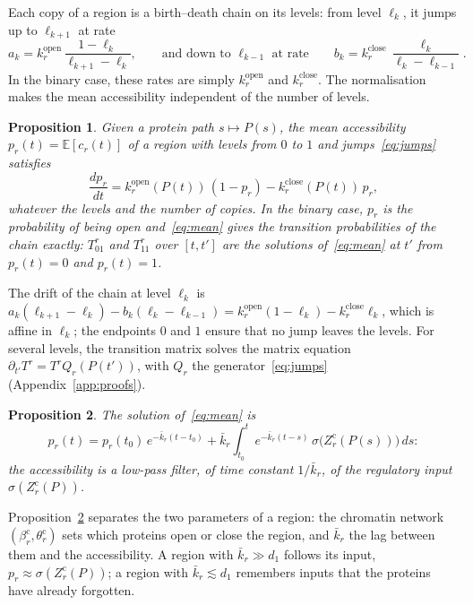 \documentclass[a4paper, 11pt]{article}
\newcommand{\E}{\mathbb{E}}
\newcommand{\kop}{k^{\mathrm{open}}}
\newcommand{\kcl}{k^{\mathrm{close}}}
\newcommand{\thc}{\theta^{\mathrm{c}}}
\newcommand{\bc}{\beta^{\mathrm{c}}}
\theoremstyle{plain}
\newtheorem{prop}{Proposition}
\theoremstyle{remark}
\begin{document}
Each copy of a region is a birth--death chain on its levels: from level $\ell_k$, it jumps up to $\ell_{k+1}$ at rate
\begin{equation}\label{eq:jumps}
a_k = \kop_r\,\frac{1 - \ell_k}{\ell_{k+1} - \ell_k}, \qquad\text{and down to } \ell_{k-1} \text{ at rate}\qquad b_k = \kcl_r\,\frac{\ell_k}{\ell_k - \ell_{k-1}} .
\end{equation}
In the binary case, these rates are simply $\kop_r$ and $\kcl_r$. The normalisation makes the mean accessibility independent of the number of levels.

\begin{prop}\label{prop:mean}
Given a protein path $s \mapsto P(s)$, the mean accessibility $p_r(t) = \E[c_r(t)]$ of a region with levels from $0$ to $1$ and jumps~\eqref{eq:jumps} satisfies
\begin{equation}\label{eq:mean}
\frac{dp_r}{dt} = \kop_r(P(t))\,(1 - p_r) - \kcl_r(P(t))\,p_r ,
\end{equation}
whatever the levels and the number of copies. In the binary case, $p_r$ is the probability of being open and~\eqref{eq:mean} gives the transition probabilities of the chain exactly: $T^r_{01}$ and $T^r_{11}$ over $[t, t']$ are the solutions of~\eqref{eq:mean} at $t'$ from $p_r(t) = 0$ and $p_r(t) = 1$.
\end{prop}

The drift of the chain at level $\ell_k$ is $a_k(\ell_{k+1} - \ell_k) - b_k(\ell_k - \ell_{k-1}) = \kop_r(1-\ell_k) - \kcl_r\ell_k$, which is affine in $\ell_k$; the endpoints $0$ and $1$ ensure that no jump leaves the levels. For several levels, the transition matrix solves the matrix equation $\partial_{t'}T^r = T^r Q_r(P(t'))$, with $Q_r$ the generator~\eqref{eq:jumps} (Appendix~\ref{app:proofs}).

\begin{prop}\label{prop:filter}
The solution of~\eqref{eq:mean} is
\begin{equation}\label{eq:filter}
p_r(t) = p_r(t_0)\,e^{-\bar k_r(t - t_0)} + \bar k_r\int_{t_0}^{t} e^{-\bar k_r(t - s)}\,\sigma\bigl(Z^{\mathrm{c}}_r(P(s))\bigr)\,ds :
\end{equation}
the accessibility is a low-pass filter, of time constant $1/\bar k_r$, of the regulatory input $\sigma(Z^{\mathrm{c}}_r(P))$.
\end{prop}

Proposition~\ref{prop:filter} separates the two parameters of a region: the chromatin network $(\bc_r, \thc_r)$ sets which proteins open or close the region, and $\bar k_r$ the lag between them and the accessibility. A region with $\bar k_r \gg d_{1}$ follows its input, $p_r \approx \sigma(Z^{\mathrm{c}}_r(P))$; a region with $\bar k_r \lesssim d_1$ remembers inputs that the proteins have already forgotten.
\end{document}
